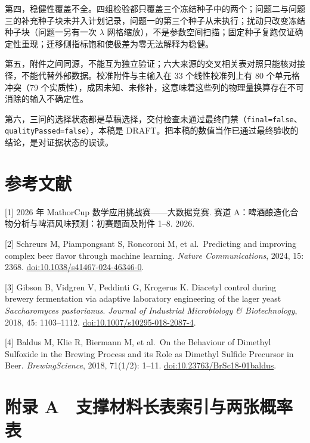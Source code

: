 \documentclass[11pt,a4paper]{article}
\begin{document}
第四，稳健性覆盖不全。四组检验都只覆盖三个冻结种子中的两个；问题二与问题三的补充种子块未并入计划记录，问题一的第三个种子从未执行；扰动只改变冻结种子块（问题一另有一次
\(\lambda\)
网格缩放），不是参数空间扫描；固定种子复跑仅证确定性重现；迁移侧指标饱和使极差为零无法解释为稳健。

第五，附件之间同源，不能互为独立验证；六大来源的交叉相关表对照只能核对接径，不能代替外部数据。校准附件与主输入在
33 个线性校准列上有 80 个单元格冲突（79
个实质性），成因未知、未修补，这意味着这些列的物理量换算存在不可消除的输入不确定性。

第六，三问的选择状态都是草稿选择，交付检查未通过最终门禁（\texttt{final=false}、\texttt{qualityPassed=false}），本稿是
DRAFT。把本稿的数值当作已通过最终验收的结论，是对证据状态的误读。

\section*{参考文献}\label{ux53c2ux8003ux6587ux732e}

{[}1{]} 2026 年 MathorCup 数学应用挑战赛------大数据竞赛. 赛道
A：啤酒酿造化合物分析与啤酒风味预测：初赛题面及附件 1--8. 2026.

{[}2{]} Schreurs M, Piampongsant S, Roncoroni M, et al.~Predicting and
improving complex beer flavor through machine learning. \emph{Nature
Communications}, 2024, 15: 2368.
\href{https://doi.org/10.1038/s41467-024-46346-0}{doi:10.1038/s41467-024-46346-0}.

{[}3{]} Gibson B, Vidgren V, Peddinti G, Krogerus K. Diacetyl control
during brewery fermentation via adaptive laboratory engineering of the
lager yeast \emph{Saccharomyces pastorianus}. \emph{Journal of
Industrial Microbiology \& Biotechnology}, 2018, 45: 1103--1112.
\href{https://doi.org/10.1007/s10295-018-2087-4}{doi:10.1007/s10295-018-2087-4}.

{[}4{]} Baldus M, Klie R, Biermann M, et al.~On the Behaviour of
Dimethyl Sulfoxide in the Brewing Process and its Role as Dimethyl
Sulfide Precursor in Beer. \emph{BrewingScience}, 2018, 71(1/2): 1--11.
\href{https://doi.org/10.23763/BrSc18-01baldus}{doi:10.23763/BrSc18-01baldus}.

\newpage
\appendix

\section*{附录
A　支撑材料长表索引与两张概率表}\label{ux9644ux5f55-a-ux652fux6491ux6750ux6599ux957fux8868ux7d22ux5f15ux4e0eux4e24ux5f20ux6982ux7387ux8868}
\end{document}
